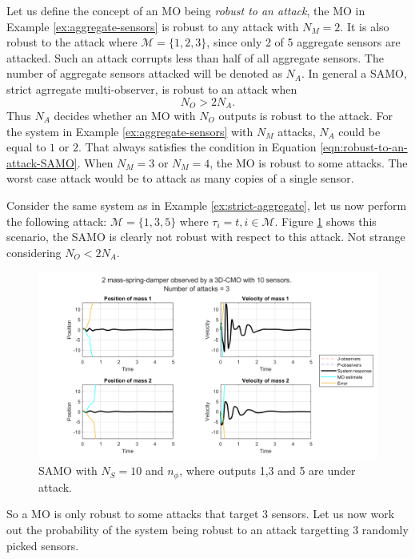 Let us define the concept of an MO being \textit{robust to an attack}, the MO in Example \ref{ex:aggregate-sensors} is robust to any attack with $N_M=2$. It is also robust to the attack where $\mathcal{M}=\{1,2,3\}$, since only 2 of 5 aggregate sensors are attacked. Such an attack corrupts less than half of all aggregate sensors. The number of aggregate sensors attacked will be denoted as $N_A$. In general a SAMO, strict agrregate multi-observer, is robust to an attack when
\begin{equation}\label{eqn:robust-to-an-attack-SAMO}
    N_O > 2N_A.
\end{equation}
Thus $N_A$ decides whether an MO with $N_O$ outputs is robust to the attack. For the system in Example \ref{ex:aggregate-sensors} with $N_M$ attacks, $N_A$ could be equal to $1$ or $2$. That always satisfies the condition in Equation \eqref{eqn:robust-to-an-attack-SAMO}. When $N_M=3$ or $N_M=4$, the MO is robust to some attacks. The worst case attack would be to attack as many copies of a single sensor.
\begin{example}\label{ex:SAMO-attack}
    Consider the same system as in Example \ref{ex:strict-aggregate}, let us now perform the following attack: $\mathcal{M}=\{1,3,5\}$ where $\tau_i=t,i\in\mathcal{M}$. Figure \ref{fig:SAMO-attack} shows this scenario, the SAMO is clearly not robust with respect to this attack. Not strange considering $N_O< 2N_A$.

    \begin{figure}[H]
        \centering
        \includegraphics[width=\linewidth]{report/Figures/SAMO-attack-not-robust.png}   
        \caption{SAMO with $N_S=10$ and $n_{\phi}$, where outputs 1,3 and 5 are under attack.}
        \label{fig:SAMO-attack}
    \end{figure}
\end{example}
So a MO is only robust to some attacks that target 3 sensors. Let us now work out the probability of the system being robust to an attack targetting 3 randomly picked sensors.

